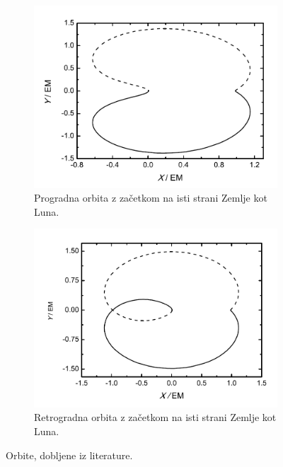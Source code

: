 \documentclass[11pt, titlepage]{article}
\begin{document}
\begin{figure}[h]
    \vspace{0.5cm}

    \begin{subfigure}[b]{0.45\textwidth}
        \centering
        \includegraphics[width=\textwidth]{figures/theory_orbit_3.png}
        \caption{Progradna orbita z začetkom na isti strani Zemlje kot Luna.}
        \label{fig:orbit_3}
    \end{subfigure}
    \hfill
    \begin{subfigure}[b]{0.45\textwidth}
        \centering
        \includegraphics[width=\textwidth]{figures/theory_orbit_4.png}
        \caption{Retrogradna orbita z začetkom na isti strani Zemlje kot Luna.}
        \label{fig:orbit_4}
    \end{subfigure}

    \caption{Orbite, dobljene iz literature.}
    \label{fig:theory_orbits}
\end{figure}
\end{document}
